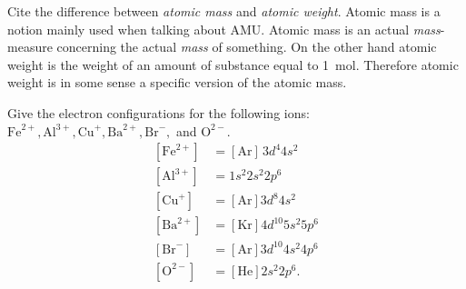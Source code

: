 
Cite the difference between \textit{atomic mass} and \textit{atomic weight}.
\bigbreak
Atomic mass is a notion mainly used when talking about \unit{AMU}. Atomic mass is an actual \textit{mass}-measure concerning the actual \textit{mass} of something. On the other hand atomic weight is the weight of an amount of substance equal to \qty{1}{mol}. Therefore atomic weight is in some sense a specific version of the atomic mass.

Give the electron configurations for the following ions: $\mathrm{Fe}^{2+},\mathrm{Al}^{3+}, \mathrm{Cu}^{+}, \mathrm{Ba}^{2+}, \mathrm{Br}^{-},$ and $\mathrm{O}^{2-}$.
\begin{align*}
    \left[ \mathrm{Fe}^{2+} \right] &= [\mathrm{Ar}] \, 3d^{4} 4s^2 \\
    \left[ \mathrm{Al}^{3+} \right] &= 1s^2 2s^2 2p^{6} \\
    \left[ \mathrm{Cu}^{+} \right] &= [\mathrm{Ar}] 3d^{8} 4s^2 \\
    \left[ \mathrm{Ba}^{2+} \right] &= [\mathrm{Kr}] 4d^{10} 5s^2 5p^{6} \\
    \left[ \mathrm{Br}^{-} \right] &= [\mathrm{Ar}] 3d^{10} 4s^2 4p^{6} \\
    \left[ \mathrm{O}^{2-} \right] &= [\mathrm{He}] 2s^2 2p^{6}
.\end{align*}


